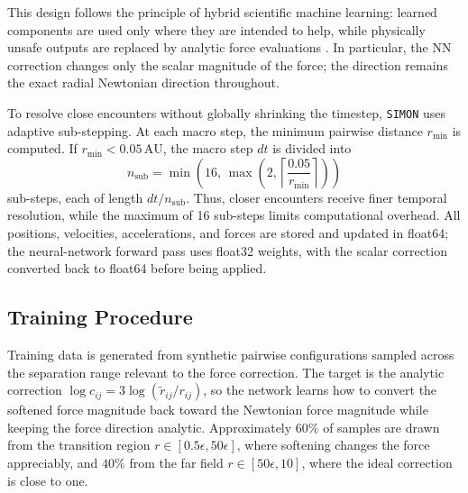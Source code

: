 \documentclass[12pt]{article}
\begin{document}
This design follows the principle of hybrid scientific machine learning: learned components
are used only where they are intended to help, while physically unsafe outputs are replaced
by analytic force evaluations \cite{ulibarrena2024hybrid}. In particular, the NN correction
changes only the scalar magnitude of the force; the direction remains the exact radial
Newtonian direction throughout.

To resolve close encounters without globally shrinking the timestep, \texttt{SIMON} uses
adaptive sub-stepping. At each macro step, the minimum pairwise distance $r_{\min}$ is
computed. If $r_{\min}<0.05\,\mathrm{AU}$, the macro step $dt$ is divided into
\[
n_{\mathrm{sub}}
=
\min\left(
16,\,
\max\left(2,\left\lceil \frac{0.05}{r_{\min}}\right\rceil\right)
\right)
\]
sub-steps, each of length $dt/n_{\mathrm{sub}}$. Thus, closer encounters receive finer temporal
resolution, while the maximum of 16 sub-steps limits computational overhead. All positions,
velocities, accelerations, and forces are stored and updated in float64; the neural-network
forward pass uses float32 weights, with the scalar correction converted back to float64 before
being applied.

\subsection{Training Procedure}
\label{sec:training}

Training data is generated from synthetic pairwise configurations sampled across the
separation range relevant to the force correction. The target is the analytic correction
$\log c_{ij}=3\log(\tilde r_{ij}/r_{ij})$, so the network learns how to convert the softened
force magnitude back toward the Newtonian force magnitude while keeping the force direction
analytic. Approximately $60\%$ of samples are drawn from the transition region
$r\in[0.5\epsilon,50\epsilon]$, where softening changes the force appreciably, and $40\%$
from the far field $r\in[50\epsilon,10]$, where the ideal correction is close to one.
\end{document}

